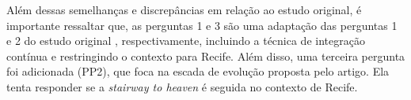 Além dessas semelhanças e discrepâncias em relação ao estudo original, é importante ressaltar que, as perguntas 1 e 3 são uma adaptação das perguntas 1 e 2 do estudo original \cite{empiricalStudy2016}, respectivamente, incluindo a técnica de integração contínua e restringindo o contexto para Recife. Além disso, uma terceira pergunta foi adicionada (PP2), que foca na escada de evolução proposta pelo artigo. Ela tenta responder se a \emph{stairway to heaven} é seguida no contexto de Recife.
